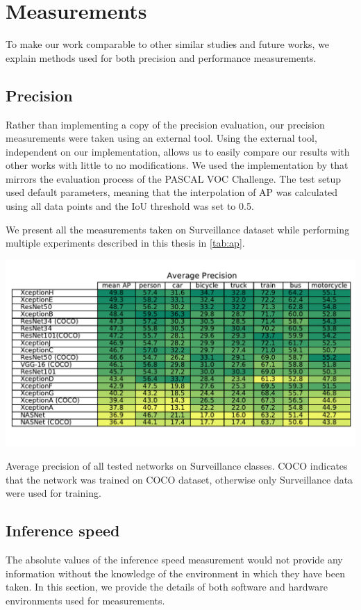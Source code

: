 \section{Measurements}
To make our work comparable to other similar studies and future works, we explain methods used for both precision and performance measurements.

\subsection{Precision}
Rather than implementing a copy of the precision evaluation, our precision measurements were taken using an external tool. Using the external tool, independent on our implementation, allows us to easily compare our results with other works with little to no modifications. We used the implementation by \citet{bib:metricsgit} that mirrors the evaluation process of the PASCAL VOC Challenge. The test setup used default parameters, meaning that the interpolation of AP was calculated using all data points and the IoU threshold was set to 0.5. 

We present all the measurements taken on Surveillance dataset while performing multiple experiments described in this thesis in \cref{tab:ap}.


\begin{table}[]
    \centering
    \includegraphics[width=\textwidth]{img/ap}
    \caption[Average precision of all tested networks on Surveillance classes]{Average precision of all tested networks on Surveillance classes. COCO indicates that the network was trained on COCO dataset, otherwise only Surveillance data were used for training.} 
    \label{tab:ap}
\end{table}

\subsection{Inference speed}
The absolute values of the inference speed measurement would not provide any information without the knowledge of the environment in which they have been taken. In this section, we provide the details of both software and hardware environments used for measurements.

